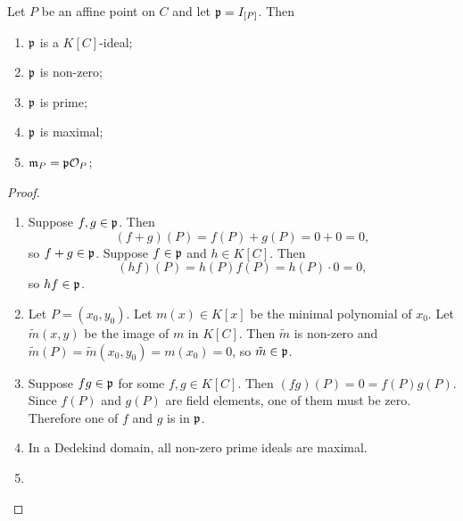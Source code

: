 \begin{proposition}
  \label{prop_I_P_is_prime}
  Let $P$ be an affine point on $C$ and let $\frak p = I_{[P]}$. Then
  \begin{enumerate}[label=(\roman*)]
    \item $\frak p$ is a $K[C]$-ideal;
    \item $\frak p$ is non-zero;
    \item $\frak p$ is prime;
    \item $\frak p$ is maximal;
    \item $\frak m_P = \frak p \cal O_P$;
  \end{enumerate}
\end{proposition}
\begin{proof}
  \begin{enumerate}[label=(\roman*)]
    \item
    Suppose $f, g \in \frak p$. Then
      \[ (f + g)(P) = f(P) + g(P) = 0 + 0 = 0, \]
    so $f + g \in \frak p$.
    Suppose $f \in \frak p$ and $h \in K[C]$. Then
      \[ (hf)(P) = h(P)f(P) = h(P)\cdot 0 = 0, \]
    so $hf \in \frak p$.
    
    \item
    Let $P = (x_0, y_0)$.
    Let $m(x) \in K[x]$ be the minimal polynomial of $x_0$.
    Let $\tilde m(x,y)$ be the image of $m$ in $K[C]$.
    Then $\tilde m$ is non-zero and $\tilde m(P) = \tilde m(x_0, y_0) = m(x_0) = 0$,
    so $\tilde m \in \frak p$.
    
    \item
    Suppose $fg \in \frak p$ for some $f, g \in K[C]$.
    Then $(fg)(P) = 0 = f(P)g(P)$.
    Since $f(P)$ and $g(P)$ are field elements, one of them must be zero.
    Therefore one of $f$ and $g$ is in $\frak p$.
    
    \item
    In a Dedekind domain, all non-zero prime ideals are maximal.
    
    \item
  \end{enumerate}
\end{proof}

